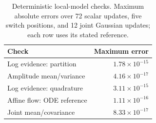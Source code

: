 \begin{table}[t]\centering\small
\caption{Deterministic local-model checks. Maximum absolute errors over 72 scalar updates, five switch positions, and 12 joint Gaussian updates; each row uses its stated reference.}
\label{tab:implemented-filter-checks}
\begin{tabular}{@{}lr@{}}\toprule
Check & Maximum error \\\midrule
Log evidence: partition & $1.78\times10^{-15}$ \\
Amplitude mean/variance & $4.16\times10^{-17}$ \\
Log evidence: quadrature & $3.11\times10^{-15}$ \\
Affine flow: ODE reference & $1.11\times10^{-16}$ \\
Joint mean/covariance & $8.33\times10^{-17}$ \\
\bottomrule\end{tabular}
\end{table}
